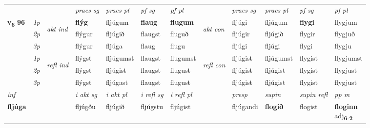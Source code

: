 \begin{longtable}[l]{X>{\footnotesize\itshape}llXXXXlXXXX}
 & &   & \textit{praes sg}  & \textit{praes pl}    & \textit{ pf sg} & \textit{pf pl} & & \textit{praes sg}  & \textit{praes pl}    & \textit{pf sg} & \textit{pf pl }  \\ \cmidrule{4-7} \cmidrule{9-12}
 \multirow{2}{*}{{{\textbf{v{\textsubscript{6}}} \Large{\textbf{96}}}}}  & 1p & \multirow{3}{*}{\begin{turn}{90}\textit{akt ind}\end{turn}} & \textbf{flýg} & fljúgum & \textbf{flaug} & \textbf{flugum} & \multirow{3}{*}{\begin{turn}{90}\textit{akt con}\end{turn}} &fljúgi & fljúgum & \textbf{flygi} & flygjum\\*
 & 2p &  &  flýgur  & fljúgið & flaugst & fluguð & & fljúgir & fljúgið & flygir & flygjuð \\*
 & 3p &  & flýgur & fljúga & flaug & flugu & & fljúgi & fljúgi& flygi & flygju \\*
\cmidrule{4-7} \cmidrule{9-12}
 & 1p & \multirow{3}{*}{\begin{turn}{90}\textit{refl ind}\end{turn}}  & flýgst & fljúgumst & flaugst & flugumst & \multirow{3}{*}{\begin{turn}{90}\textit{refl con}\end{turn}}  &fljúgist & fljúgumst & flygist & flygjumst \\*
 & 2p &  & flýgst & fljúgist & flaugst & flugust & &fljúgist & fljúgist & flygist & flygjust \\*
 & 3p  & & flýgst & fljúgast & flaugst & flugust & & fljúgist & fljúgist& flygist & flygjust \\*
\cmidrule{4-7} \cmidrule{9-12}

   {\textit{inf}} & &  & \textit{i akt sg} & \textit{i akt pl} & \textit{i refl sg} & \textit{i refl pl} && \textit{presp} & \textit{supin} & \textit{supin refl} & \textit{pp m} \\*
  {\textbf{fljúga}} & && fljúgðu  & fljúgið & fljúgstu & fljúgist && fljúgandi &  \textbf{flogið} & flogist & \specialcell{\textbf{floginn} \\ adj\textbf{\textsubscript{6-2}}} \\*

\midrule


\end{longtable}
